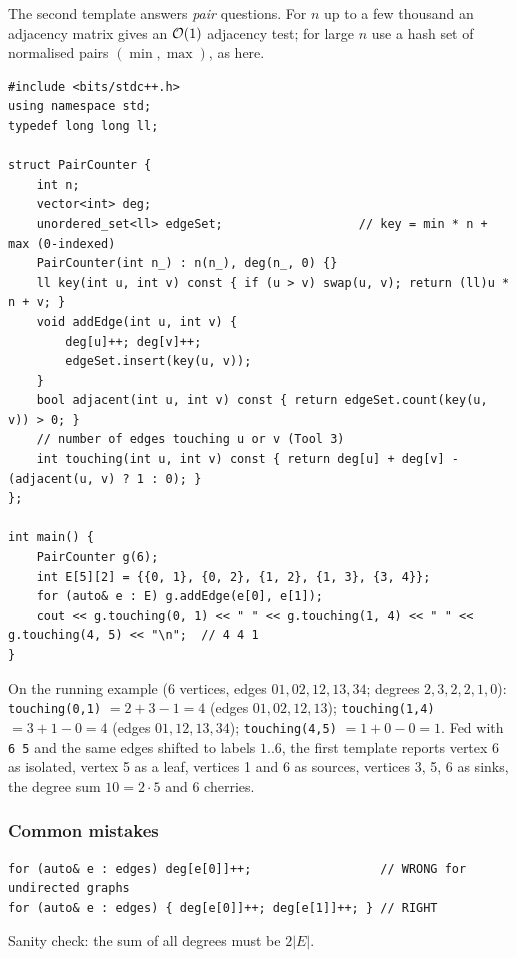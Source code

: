 The second template answers \emph{pair} questions. For $n$ up to a few thousand an adjacency matrix gives an $\mathcal{O}(1)$ adjacency test; for large $n$ use a hash set of normalised pairs $(\min, \max)$, as here.

\begin{lstlisting}[style=cpp]
#include <bits/stdc++.h>
using namespace std;
typedef long long ll;

struct PairCounter {
    int n;
    vector<int> deg;
    unordered_set<ll> edgeSet;                   // key = min * n + max (0-indexed)
    PairCounter(int n_) : n(n_), deg(n_, 0) {}
    ll key(int u, int v) const { if (u > v) swap(u, v); return (ll)u * n + v; }
    void addEdge(int u, int v) {
        deg[u]++; deg[v]++;
        edgeSet.insert(key(u, v));
    }
    bool adjacent(int u, int v) const { return edgeSet.count(key(u, v)) > 0; }
    // number of edges touching u or v (Tool 3)
    int touching(int u, int v) const { return deg[u] + deg[v] - (adjacent(u, v) ? 1 : 0); }
};

int main() {
    PairCounter g(6);
    int E[5][2] = {{0, 1}, {0, 2}, {1, 2}, {1, 3}, {3, 4}};
    for (auto& e : E) g.addEdge(e[0], e[1]);
    cout << g.touching(0, 1) << " " << g.touching(1, 4) << " " << g.touching(4, 5) << "\n";  // 4 4 1
}
\end{lstlisting}

\begin{insightbox}
On the running example ($6$ vertices, edges $01, 02, 12, 13, 34$; degrees $2,3,2,2,1,0$): \texttt{touching(0,1)} $= 2+3-1 = 4$ (edges $01,02,12,13$); \texttt{touching(1,4)} $= 3+1-0 = 4$ (edges $01,12,13,34$); \texttt{touching(4,5)} $= 1+0-0 = 1$. Fed with \texttt{6 5} and the same edges shifted to labels $1..6$, the first template reports vertex 6 as isolated, vertex 5 as a leaf, vertices 1 and 6 as sources, vertices 3, 5, 6 as sinks, the degree sum $10 = 2\cdot5$ and $6$ cherries.
\end{insightbox}

\subsubsection*{Common mistakes}

\begin{warningbox}
\begin{lstlisting}[style=snippet]
for (auto& e : edges) deg[e[0]]++;                  // WRONG for undirected graphs
for (auto& e : edges) { deg[e[0]]++; deg[e[1]]++; } // RIGHT
\end{lstlisting}
Sanity check: the sum of all degrees must be $2|E|$.
\end{warningbox}

